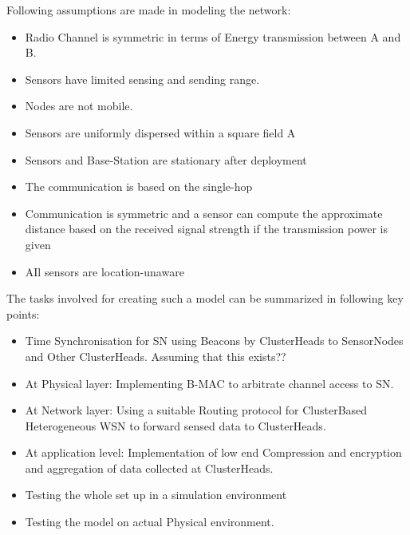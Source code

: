 \noindent Following assumptions are made in modeling the network:

\begin{itemize}
	\item Radio Channel is symmetric in terms of Energy transmission between A and B.
	
	\item Sensors have limited sensing and sending range.
	
	\item Nodes are not mobile.
	
	\item Sensors are uniformly dispersed within a square field A
	
	\item Sensors and Base-Station are stationary after deployment
	
	\item The communication is based on the single-hop
	
	\item Communication is symmetric and a sensor can compute the approximate distance based on the received signal strength if the transmission power is given
	
	\item AIl sensors are location-unaware
\end{itemize}

\noindent The tasks involved for creating such a model can be summarized in following key points:

\begin{itemize}
	\item Time Synchronisation for SN using Beacons by ClusterHeads to SensorNodes and Other ClusterHeads. Assuming that this exists??
	
	\item At Physical layer: Implementing B-MAC to arbitrate channel access to SN.
	
	\item At Network layer: Using a suitable Routing protocol for ClusterBased Heterogeneous \acf{WSN} to forward sensed data to ClusterHeads.
	
	\item At application level: Implementation of low end Compression and encryption and aggregation of data collected at ClusterHeads.
	
	\item Testing the whole set up in a simulation environment
	
	\item Testing the model on actual Physical environment.
	
\end{itemize} 




